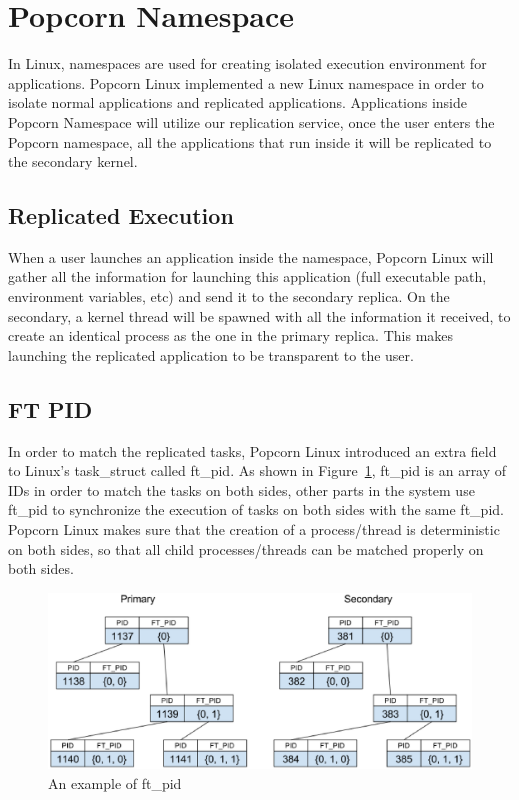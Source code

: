 \section{Popcorn Namespace}
In Linux, namespaces are used for creating isolated execution environment for applications. Popcorn Linux implemented a new Linux namespace in order to isolate normal applications and replicated applications. Applications inside Popcorn Namespace will utilize our replication service, once the user enters the Popcorn namespace, all the applications that run inside it will be replicated to the secondary kernel.

\subsection{Replicated Execution}
When a user launches an application inside the namespace, Popcorn Linux will gather all the information for launching this application (full executable path, environment variables, etc) and send it to the secondary replica. On the secondary, a kernel thread will be spawned with all the information it received, to create an identical process as the one in the primary replica. This makes launching the replicated application to be transparent to the user.

\subsection{FT PID}
In order to match the replicated tasks, Popcorn Linux introduced an extra field to Linux's task\_struct called ft\_pid. As shown in Figure~\ref{f:ft_pid}, ft\_pid is an array of IDs in order to match the tasks on both sides, other parts in the system use ft\_pid to synchronize the execution of tasks on both sides with the same ft\_pid. Popcorn Linux makes sure that the creation of a process/thread is deterministic on both sides, so that all child processes/threads can be matched properly on both sides.
\begin{figure}[!ht]
\centering
\includegraphics[width=.9575\columnwidth]{figures/ft_pid}
 \caption{An example of ft\_pid}
 \label{f:ft_pid}
\end{figure}

